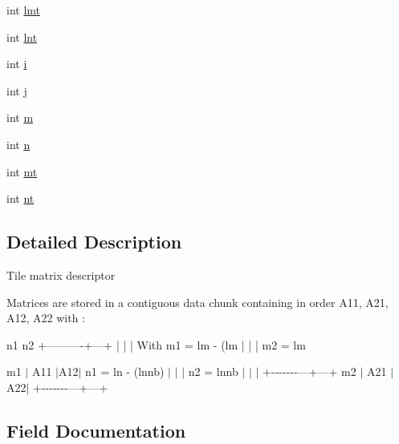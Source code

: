 \begin{DoxyCompactItemize}
\item 
int \hyperlink{structplasma__desc__t_a6c43b11d26b88311906eab54db5d1ad2_a6c43b11d26b88311906eab54db5d1ad2}{lmt}
\item 
int \hyperlink{structplasma__desc__t_a47634188eab194b20f78b8c2c32e9582_a47634188eab194b20f78b8c2c32e9582}{lnt}
\item 
int \hyperlink{structplasma__desc__t_a7508194cedb3083d9152c4e2f957dc88_a7508194cedb3083d9152c4e2f957dc88}{i}
\item 
int \hyperlink{structplasma__desc__t_a1d5e8aa30ce545ac2d9c2e75e201e976_a1d5e8aa30ce545ac2d9c2e75e201e976}{j}
\item 
int \hyperlink{structplasma__desc__t_a7f9b40af027da0a8f9af989794f31a8a_a7f9b40af027da0a8f9af989794f31a8a}{m}
\item 
int \hyperlink{structplasma__desc__t_a1deb8d67b1fca78449a40ba7a056cafd_a1deb8d67b1fca78449a40ba7a056cafd}{n}
\item 
int \hyperlink{structplasma__desc__t_a35d0d7ad5f5927bb551a357a174152c2_a35d0d7ad5f5927bb551a357a174152c2}{mt}
\item 
int \hyperlink{structplasma__desc__t_a7595a9db8b1b8360b5fa9726b998a117_a7595a9db8b1b8360b5fa9726b998a117}{nt}
\end{DoxyCompactItemize}


\subsection{Detailed Description}


 Tile matrix descriptor

Matrices are stored in a contiguous data chunk containing in order A11, A21, A12, A22 with \+: \begin{DoxyVerb}     n1      n2
+----------+---+
|          |   |    With m1 = lm - (lm%
|          |   |         m2 = lm%
\end{DoxyVerb}
 m1 $\vert$ A11 $\vert$\+A12$\vert$ n1 = ln -\/ (lnnb) $\vert$ $\vert$ $\vert$ n2 = lnnb $\vert$ $\vert$ $\vert$ +-\/-\/-\/-\/-\/-\/-\/---+---+ m2 $\vert$ A21 $\vert$\+A22$\vert$ +-\/-\/-\/-\/-\/-\/-\/---+---+ 

\subsection{Field Documentation}
\hypertarget{structplasma__desc__t_a5081e56a01179e8b9305912676909a13_a5081e56a01179e8b9305912676909a13}{}
